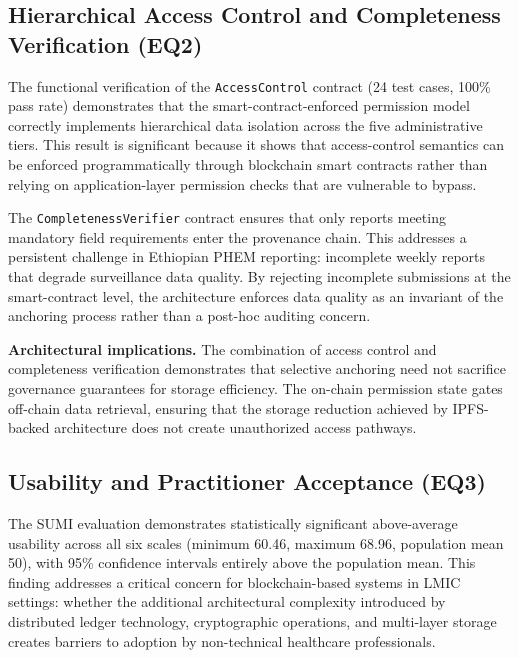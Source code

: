 \subsection{Hierarchical Access Control and Completeness Verification (EQ2)}\label{subsec:disc_access}

The functional verification of the \texttt{AccessControl} contract (24 test cases, 100\% pass rate) demonstrates that the smart-contract-enforced permission model correctly implements hierarchical data isolation across the five administrative tiers. This result is significant because it shows that access-control semantics can be enforced programmatically through blockchain smart contracts rather than relying on application-layer permission checks that are vulnerable to bypass.

The \texttt{CompletenessVerifier} contract ensures that only reports meeting mandatory field requirements enter the provenance chain. This addresses a persistent challenge in Ethiopian PHEM reporting: incomplete weekly reports that degrade surveillance data quality. By rejecting incomplete submissions at the smart-contract level, the architecture enforces data quality as an invariant of the anchoring process rather than a post-hoc auditing concern.

\textbf{Architectural implications.} The combination of access control and completeness verification demonstrates that selective anchoring need not sacrifice governance guarantees for storage efficiency. The on-chain permission state gates off-chain data retrieval, ensuring that the storage reduction achieved by IPFS-backed architecture does not create unauthorized access pathways.

\subsection{Usability and Practitioner Acceptance (EQ3)}\label{subsec:disc_usability}

The SUMI evaluation demonstrates statistically significant above-average usability across all six scales (minimum 60.46, maximum 68.96, population mean 50), with 95\% confidence intervals entirely above the population mean. This finding addresses a critical concern for blockchain-based systems in LMIC settings: whether the additional architectural complexity introduced by distributed ledger technology, cryptographic operations, and multi-layer storage creates barriers to adoption by non-technical healthcare professionals.

